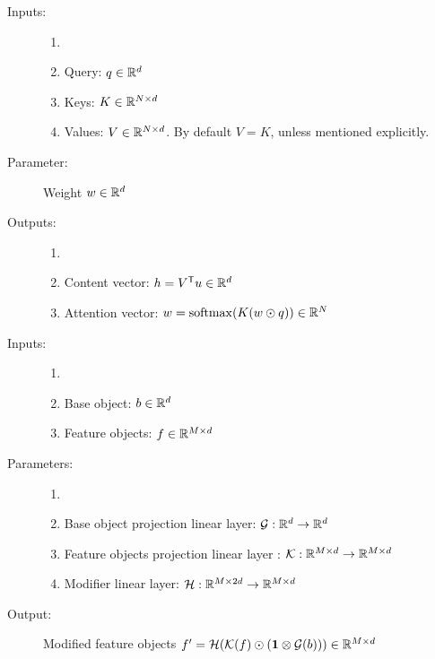 
\begin{description}
	\item[Inputs:] 
	\begin{enumerate}
		\item[]
		\item Query: $q \in \mathbb{R}^d$
		\item Keys: $K \in \mathbb{R}^{N \times d}$	
		\item Values: $V \in \mathbb{R}^{N \times d}$. By default $V=K$, unless mentioned explicitly.	
	\end{enumerate}
	
	\item[Parameter:] Weight $w \in \mathbb{R}^d$
	
	\item[Outputs:] 
	\begin{enumerate}
		\item[]
		\item Content vector: $h =  V^{\mathsf{T}} u \in \mathbb{R}^d$
		\item Attention vector:  $w = \operatorname{\mathrm{softmax}}(K(w \odot q)) \in \mathbb{R}^N$
	\end{enumerate}
\end{description}



\begin{description}
	\item[Inputs:] 
	\begin{enumerate}
		\item[]
		\item Base object: $b \in \mathbb{R}^d$
		\item Feature objects: $f \in \mathbb{R}^{M \times d}$	
	\end{enumerate}
	
	\item[Parameters:] 
	\begin{enumerate}
		\item[]
		\item Base object projection linear layer: $\mathcal{G}: \mathbb{R}^d \to \mathbb{R}^d$
		\item Feature objects projection linear layer : $\mathcal{K}: \mathbb{R}^{M \times d} \to \mathbb{R}^{M \times d}$
		\item Modifier linear layer:  $\mathcal{H}: \mathbb{R}^{M \times 2d} \to \mathbb{R}^{M \times d}$	
	\end{enumerate}
	
	\item[Output:] Modified feature objects 
	$f' =  \mathcal{H}( \mathcal{K}(f) \odot ( \mathbf{1} \otimes \mathcal{G}(b))) \in  \mathbb{R}^{M \times d}$
\end{description}

